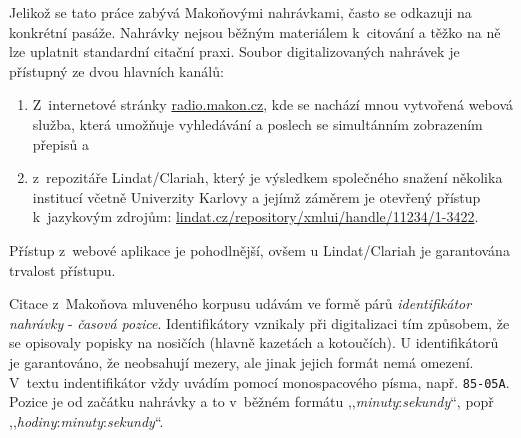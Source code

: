 Jelikož se tato práce zabývá Makoňovými nahrávkami, často se odkazuji na
konkrétní pasáže. Nahrávky nejsou běžným materiálem k~citování a těžko na ně lze
uplatnit standardní citační praxi. Soubor digitalizovaných nahrávek je
přístupný ze dvou hlavních kanálů:
\begin{enumerate}
\item{
  Z~internetové stránky \href{http://radio.makon.cz/}{radio.makon.cz}, kde se nachází mnou vytvořená
  webová služba, která umožňuje vyhledávání a poslech se simultánním zobrazením
  přepisů a
}
\item{
  z~repozitáře Lindat/Clariah, který je výsledkem společného snažení několika
  institucí včetně Univerzity Karlovy a jejímž záměrem je otevřený přístup
  k~jazykovým zdrojům: \href{https://lindat.cz/repository/xmlui/handle/11234/1-3422}{lindat.cz/repository/xmlui/handle/11234/1-3422}.
}
\end{enumerate}
Přístup z~webové aplikace je pohodlnější, ovšem u Lindat/Clariah je garantována
trvalost přístupu.

Citace z~Makoňova mluveného korpusu udávám ve formě párů \textit{identifikátor
nahrávky} - \textit{časová pozice}. Identifikátory vznikaly při digitalizaci tím
způsobem, že se opisovaly popisky na nosičích (hlavně kazetách a kotoučích). U
identifikátorů je garantováno, že neobsahují mezery, ale jinak jejich formát
nemá omezení. V~textu indentifikátor vždy uvádím pomocí monospacového písma, např.
\texttt{85-05A}. Pozice je od začátku nahrávky a to v~běžném formátu
,,\textit{minuty}:\textit{sekundy}``, popř
,,\textit{hodiny}:\textit{minuty}:\textit{sekundy}``.
